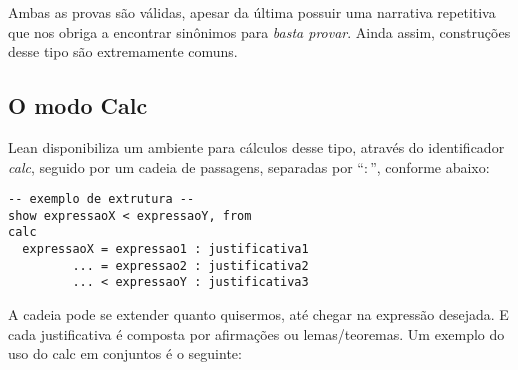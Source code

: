 \noindent Ambas as provas são válidas, apesar da última possuir uma narrativa repetitiva que nos obriga a encontrar sinônimos para \textit{basta provar}. Ainda assim, construções desse tipo são extremamente comuns.




\subsection{O modo Calc}
Lean disponibiliza um ambiente para cálculos desse tipo, através do identificador \textit{calc}, seguido por um cadeia de passagens, separadas por ``$:$'', conforme abaixo:

\vspace{5mm}
\begin{lstlisting}
-- exemplo de extrutura --
show expressaoX < expressaoY, from
calc
  expressaoX = expressao1 : justificativa1
         ... = expressao2 : justificativa2
         ... < expressaoY : justificativa3
\end{lstlisting}
\vspace{5mm}

\noindent A cadeia pode se extender quanto quisermos, até chegar na expressão desejada. E cada justificativa é composta por afirmações ou lemas/teoremas. Um exemplo do uso do {\selectfont calc} em conjuntos é o seguinte:

